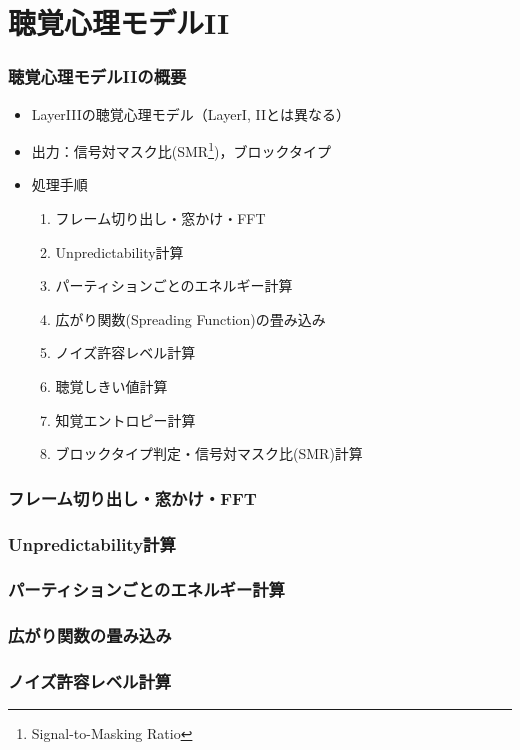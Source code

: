 \documentclass[14pt,xcolor=dvipsnames,table,dvipdfmx]{beamer}
\begin{document}
\section{聴覚心理モデルII}

\begin{frame}[c]
    \frametitle{聴覚心理モデルIIの概要}
    \begin{itemize}
        \item LayerIIIの聴覚心理モデル（LayerI, IIとは異なる）
        \item 出力：信号対マスク比(SMR\footnote{Signal-to-Masking Ratio})，ブロックタイプ
        \item 処理手順
            \begin{enumerate}
                \item フレーム切り出し・窓かけ・FFT
                \item Unpredictability計算
                \item パーティションごとのエネルギー計算
                \item 広がり関数(Spreading Function)の畳み込み
                \item ノイズ許容レベル計算
                \item 聴覚しきい値計算
                \item 知覚エントロピー計算
                \item ブロックタイプ判定・信号対マスク比(SMR)計算
            \end{enumerate}
    \end{itemize}
\end{frame}

\begin{frame}[c]
    \frametitle{フレーム切り出し・窓かけ・FFT}
\end{frame}

\begin{frame}[c]
    \frametitle{Unpredictability計算}
\end{frame}

\begin{frame}[c]
    \frametitle{パーティションごとのエネルギー計算}
\end{frame}

\begin{frame}[c]
    \frametitle{広がり関数の畳み込み}
\end{frame}

\begin{frame}[c]
    \frametitle{ノイズ許容レベル計算}
\end{frame}
\end{document}
